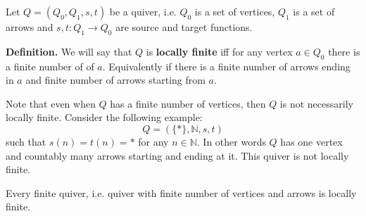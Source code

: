 \documentclass[12pt]{article}
\begin{document}
Let $Q=(Q_0,Q_1,s,t)$ be a quiver, i.e. $Q_0$ is a set of vertices, $Q_1$ is a set of arrows and $s,t:Q_1\to Q_0$ are source and target functions.

\textbf{Definition.} We will say that $Q$ is \textbf{locally finite} iff for any vertex $a\in Q_0$ there is a finite number of  of $a$. Equivalently if there is a finite number of arrows ending in $a$ and finite number of arrows starting from $a$.

Note that even when $Q$ has a finite number of vertices, then $Q$ is not necessarily locally finite. Consider the following example:
$$Q=(\{*\},\mathbb{N},s,t)$$
such that $s(n)=t(n)=*$ for any $n\in\mathbb{N}$. In other words $Q$ has one vertex and countably many arrows starting and ending at it. This quiver is not locally finite.

Every finite quiver, i.e. quiver with finite number of vertices and arrows is locally finite.
\end{document}
